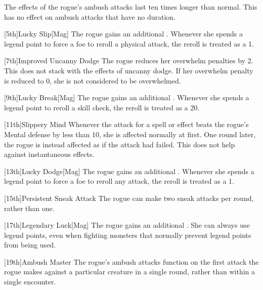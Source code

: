         The effects of the rogue's ambush attacks last ten times longer than normal.
        This has no effect on ambush attacks that have no duration.

        [5th]{Lucky Slip}[Mag]
        The rogue gains an additional .
        Whenever she spends a legend point to force a foe to reroll a physical attack, the reroll is treated as a 1.

        [7th]{Improved Uncanny Dodge}
        The rogue reduces her overwhelm penalties by 2.
        This does not stack with the effects of uncanny dodge.
        If her overwhelm penalty is reduced to 0, she is not considered to be overwhelmed.

        [9th]{Lucky Break}[Mag]
        The rogue gains an additional .
        Whenever she spends a legend point to reroll a skill check, the reroll is treated as a 20.

        [11th]{Slippery Mind}
        Whenever the attack for a  spell or effect beats the rogue's Mental defense by less than 10, she is affected normally at first.
        One round later, the rogue is instead affected as if the attack had failed.
        This does not help against instantaneous effects.

        [13th]{Lucky Dodge}[Mag]
        The rogue gains an additional .
        Whenever she spends a legend point to force a foe to reroll any attack, the reroll is treated as a 1.

        [15th]{Persistent Sneak Attack}
        The rogue can make two sneak attacks per round, rather than one.

        [17th]{Legendary Luck}[Mag]
        The rogue gains an additional .
        She can always use legend points, even when fighting monsters that normally prevent legend points from being used.

        [19th]{Ambush Master}
        The rogue's ambush attacks function on the first attack the rogue makes against a particular creature in a single round, rather than within a single encounter.

